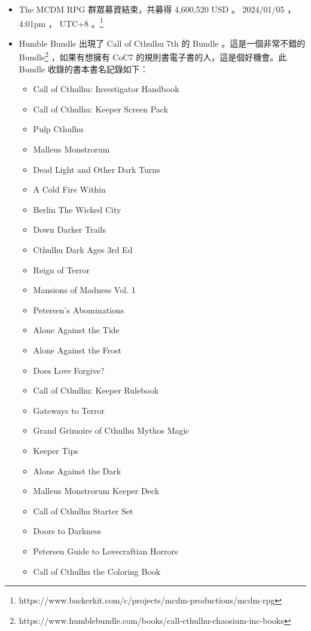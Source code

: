 \documentclass[10pt, a5paper]{article}
\begin{document}
\begin{CJK}{UTF8}{bsmi}
\begin{itemize}
  \item The MCDM RPG 群眾募資結束，共募得 4,600,520 USD 。 2024/01/05 ， 4:01pm ， UTC+8 。\footnote{https://www.backerkit.com/c/projects/mcdm-productions/mcdm-rpg}
  \item Humble Bundle 出現了 Call of Cthulhu 7th 的 Bundle 。這是一個非常不錯的 Bundle\footnote{https://www.humblebundle.com/books/call-cthulhu-chaosium-inc-books} ，如果有想擁有 CoC7 的規則書電子書的人，這是個好機會。此 Bundle 收錄的書本書名記錄如下：
  \begin{itemize}
    \item Call of Cthulhu: Investigator Handbook
    \item Call of Cthulhu: Keeper Screen Pack
    \item Pulp Cthulhu
    \item Malleus Monstrorum
    \item Dead Light and Other Dark Turns
    \item A Cold Fire Within
    \item Berlin The Wicked City
    \item Down Darker Trails
    \item Cthulhu Dark Ages 3rd Ed
    \item Reign of Terror
    \item Mansions of Madness Vol. 1
    \item Petersen's Abominations
    \item Alone Against the Tide
    \item Alone Against the Frost
    \item Does Love Forgive?
    \item Call of Cthulhu: Keeper Rulebook
    \item Gateways to Terror
    \item Grand Grimoire of Cthulhu Mythos Magic
    \item Keeper Tips
    \item Alone Against the Dark
    \item Malleus Monstrorum Keeper Deck
    \item Call of Cthulhu Starter Set
    \item Doors to Darkness
    \item Petersen Guide to Lovecraftian Horrors
    \item Call of Cthulhu the Coloring Book
  \end{itemize}
\end{itemize}


\end{CJK}
\end{document}
